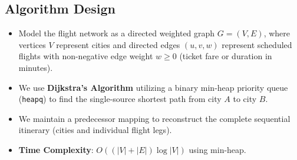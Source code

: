 \documentclass[12pt]{article}
\begin{document}
\subsection*{Algorithm Design}
\begin{itemize}
    \item Model the flight network as a directed weighted graph $G = (V, E)$, where vertices $V$ represent cities and directed edges $(u, v, w)$ represent scheduled flights with non-negative edge weight $w \ge 0$ (ticket fare or duration in minutes).
    \item We use \textbf{Dijkstra's Algorithm} utilizing a binary min-heap priority queue (\texttt{heapq}) to find the single-source shortest path from city $A$ to city $B$.
    \item We maintain a predecessor mapping to reconstruct the complete sequential itinerary (cities and individual flight legs).
    \item \textbf{Time Complexity}: $O((|V| + |E|) \log |V|)$ using min-heap.
\end{itemize}
\end{document}

